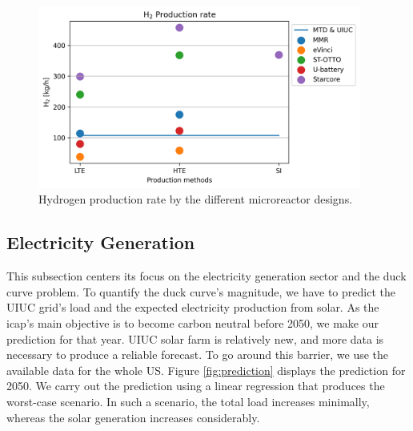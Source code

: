	\begin{figure}[htbp!]
	    \centering
		\includegraphics[height=6.0cm]{figures-hydro/reactors-by-hour1}
		\hfill
		\caption{Hydrogen production rate by the different microreactor designs.}
		\label{fig:hydro-micro}
	\end{figure}

\subsection{Electricity Generation}

This subsection centers its focus on the electricity generation sector and the duck curve problem.
To quantify the duck curve's magnitude, we have to predict the \gls{UIUC} grid's load and the expected electricity production from solar. 
As the \gls{icap}'s main objective is to become carbon neutral before 2050, we make our prediction for that year.
\gls{UIUC} solar farm is relatively new, and more data is necessary to produce a reliable forecast.
To go around this barrier, we use the available data for the whole \gls{US}.
Figure \ref{fig:prediction} displays the prediction for 2050.
We carry out the prediction using a linear regression that produces the worst-case scenario.
In such a scenario, the total load increases minimally, whereas the solar generation increases considerably.

